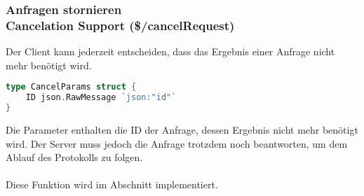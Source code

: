 \documentclass[./einleitung.tex]{subfiles}
\begin{document}
    \subsubsection[Anfragen stornieren]{Anfragen stornieren\\ {\textnormal{\footnotesize Cancelation Support (\$/cancelRequest) \cite{cancelation}}}} \label{subsubsec:cancel}
    Der Client kann jederzeit entscheiden, dass das Ergebnis einer Anfrage nicht mehr benötigt wird.
    \begin{lstlisting}[language=Go,title=Definition der Parameter,label={lst:cancelParams}]
type CancelParams struct {
	ID json.RawMessage `json:"id"`
}
    \end{lstlisting}
    Die Parameter enthalten die ID der Anfrage, dessen Ergebnis nicht mehr benötigt wird.
    Der Server muss jedoch die Anfrage trotzdem noch beantworten, um dem Ablauf des Protokolls zu folgen.
    \\\\
    Diese Funktion wird im Abschnitt  implementiert.
\end{document}
